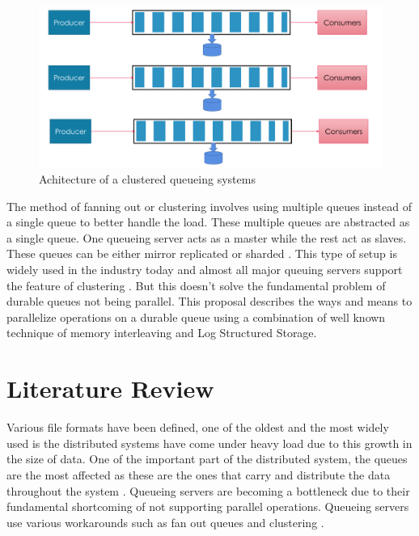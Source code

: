 \documentclass[12pt,a4paper]{article}
\begin{document}
 
\begin{figure}
   	\centering
   	\textbf{}\par\medskip
   	\includegraphics[scale=0.6]{2}
   	\caption{Achitecture of a clustered queueing systems}
   	\label{fig:gdulld}
\end{figure}
     
 
 The method of fanning out or clustering involves using multiple queues instead of a single queue to better handle the load. These multiple queues are abstracted as a single queue. One queueing server acts as a master while the rest act as slaves. These queues can be either mirror replicated or sharded \citep{albrecht2013making}. This type of setup is widely used in the industry today and almost all major queuing servers support the feature of clustering \citep{kermarrec2013xl}. But this doesn't solve the fundamental problem of durable queues not being parallel. This proposal describes the ways and means to parallelize operations on a durable queue using a combination of well known technique of memory interleaving and Log Structured Storage.
 

 
\section{Literature Review}
\label{ric:litreview} %

 Various file formats have been defined, one of the oldest and the most widely used is the distributed systems have come under heavy load due to this growth in the size of data. One of the important part of the distributed system, the queues are the most affected as these are the ones that carry and distribute the data throughout the system \citep{lamport1978time}. Queueing servers are becoming a bottleneck due to their fundamental shortcoming of not supporting parallel operations. Queueing servers use various workarounds such as fan out queues and clustering \citep{albrecht2013making}.
 
\end{document}
